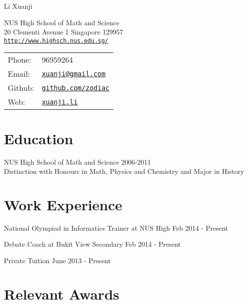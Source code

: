\documentclass[letterpaper]{article}
\def\name{Li Xuanji}
\renewenvironment{itemize}{
  \begin{list}{}{
    \setlength{\leftmargin}{1.5em}
  }
}{
  \end{list}
}
\begin{document}
{\huge \name}

\vspace{0.25in}


\begin{minipage}{0.45\linewidth}
  NUS High School of Math and Science \\
  20 Clementi Avenue 1 Singapore 129957 \\
  \href{http://www.highsch.nus.edu.sg/}{\tt http://www.highsch.nus.edu.sg/}
\end{minipage}
\begin{minipage}{0.45\linewidth}
  \begin{tabular}{ll}
    Phone: & 96959264 \\
    Email: & \href{mailto:xuanji@gmail.com}{\tt xuanji@gmail.com} \\
    Github: & \href{https://github.com/zodiac}{\tt github.com/zodiac} \\
    Web: &\href{xuanji.li}{\tt xuanji.li}
  \end{tabular}
\end{minipage}


\section*{Education}


\begin{itemize}
  \item NUS High School of Math and Science \hfill 2006-2011 \\
  Distinction with Honours in Math, Physics and Chemistry and Major in History
\end{itemize}


\section*{Work Experience}


\begin{itemize}
  \item National Olympiad in Informatics Trainer at NUS High \hfill Feb 2014 - Present
  \item Debate Coach at Bukit View Secondary \hfill Feb 2014 - Present
  \item Private Tuition \hfill June 2013 - Present
\end{itemize}

\section*{Relevant Awards}
\end{document}
